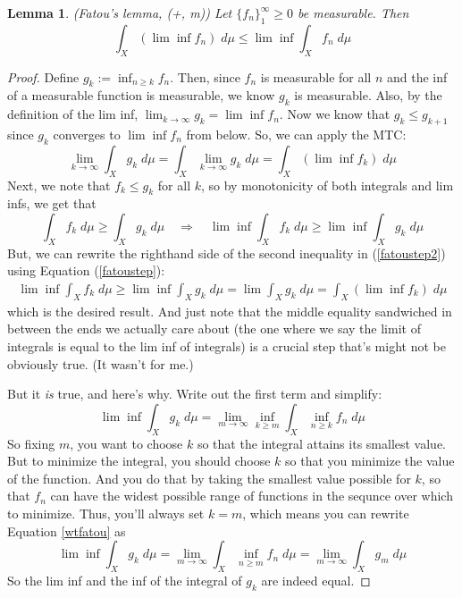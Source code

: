 \documentclass[12pt]{article}
\theoremstyle{plain}
\newtheorem{lem}[thm]{Lemma}
\theoremstyle{definition}
\theoremstyle{remark}
\begin{document}
\begin{lem}
\label{fatoulem}
\emph{(Fatou's lemma, (+, m))} Let $\{f_n\}^\infty_1\geq0$ be measurable. Then 
\[
    \int_X \left(\lim \inf f_n\right) \; d\mu
    \leq \lim \inf \int_X f_n \; d\mu
\]
\end{lem}
\begin{proof}
Define $g_k := \inf_{n\geq k} f_n$. Then, since $f_n$ is measurable for all $n$ and the inf of a measurable function is measurable, we know $g_k$ is measurable. Also, by the definition of the lim inf, $\lim_{k\rightarrow\infty} g_k = \lim \inf f_n$. Now we know that $g_k\leq g_{k+1}$ since $g_k$ converges to $\lim \inf f_n$ from below. So, we can apply the MTC:
\begin{equation}
    \label{fatoustep}
    \lim_{k\rightarrow\infty} \int_X g_k \; d\mu = 
    \int_X \lim_{k\rightarrow\infty} g_k \; d\mu = 
    \int_X (\lim\inf f_k) \; d\mu 
\end{equation}
Next, we note that $f_k\leq g_k$ for all $k$, so by monotonicity of both integrals and lim infs, we get that
\begin{equation}
    \label{fatoustep2}
    \int_X f_k \; d\mu \geq \int_X g_k \; d\mu
    \quad \Rightarrow\quad
    \lim \inf \int_X f_k \; d\mu \geq 
    \lim \inf \int_X g_k \; d\mu
\end{equation}
But, we can rewrite the righthand side of the second inequality in (\ref{fatoustep2}) using Equation (\ref{fatoustep}):
\begin{align*}
    \lim \inf \int_X f_k \; d\mu \geq
    \lim \inf \int_X g_k \; d\mu  =
    \lim \int_X g_k \; d\mu =
    \int_X (\lim\inf f_k)\; d\mu 
\end{align*}
which is the desired result. And just note that the middle equality sandwiched in between the ends we actually care about (the one where we say the limit of integrals is equal to the lim inf of integrals) is a crucial step that's might not be obviously true. (It wasn't for me.) 

But it \emph{is} true, and here's why. Write out the first term and simplify:
\begin{equation}
    \label{wtfatou}
    \lim \inf \int_X g_k \; d\mu  = \lim_{m\rightarrow\infty}\inf_{k\geq m} \int_X \inf_{n\geq k} f_n \; d\mu
\end{equation}
So fixing $m$, you want to choose $k$ so that the integral attains its smallest value. But to minimize the integral, you should choose $k$ so that you minimize the value of the function. And you do that by taking the smallest value possible for $k$, so that $f_n$ can have the widest possible range of functions in the sequnce over which to minimize. Thus, you'll always set $k=m$, which means you can rewrite Equation \ref{wtfatou} as
\begin{equation}
    \lim \inf \int_X g_k \; d\mu  = 
        \lim_{m\rightarrow\infty} 
        \int_X \inf_{n\geq m} f_n \; d\mu
        = \lim_{m\rightarrow\infty} \int_X g_m \; d\mu
\end{equation}
So the lim inf and the inf of the integral of $g_k$ are indeed equal.
\end{proof}
\end{document}
